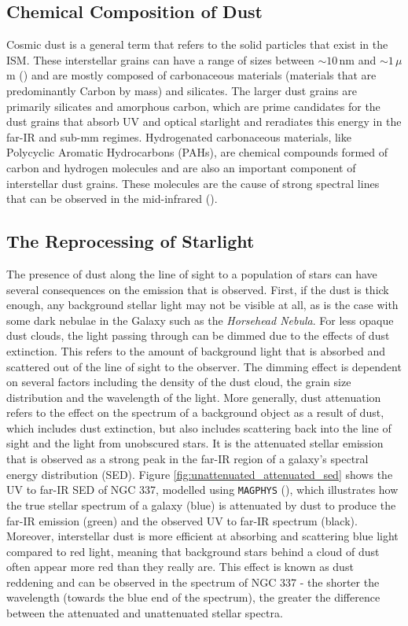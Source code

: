 \subsection{Chemical Composition of Dust}

Cosmic dust is a general term that refers to the solid particles that exist in the ISM. These interstellar grains can have a range of sizes between $\sim 10\,$nm and $\sim 1\,\mu$m (\citealt{Kim_1994, Galliano_2018}) and are mostly composed of carbonaceous materials (materials that are predominantly Carbon by mass) and silicates. The larger dust grains are primarily silicates and amorphous carbon, which are prime candidates for the dust grains that absorb UV and optical starlight and reradiates this energy in the far-IR and sub-mm regimes. Hydrogenated carbonaceous materials, like Polycyclic Aromatic Hydrocarbons (PAHs), are chemical compounds formed of carbon and hydrogen molecules and are also an important component of interstellar dust grains. These molecules are the cause of strong spectral lines that can be observed in the mid-infrared (\citealt{Tielens_1987, Draine_2007a, Draine_2007b}).

\subsection{The Reprocessing of Starlight}

The presence of dust along the line of sight to a population of stars can have several consequences on the emission that is observed. First, if the dust is thick enough, any background stellar light may not be visible at all, as is the case with some dark nebulae in the Galaxy such as the \textit{Horsehead Nebula}. For less opaque dust clouds, the light passing through can be dimmed due to the effects of dust extinction. This refers to the amount of background light that is absorbed and scattered out of the line of sight to the observer. The dimming effect is dependent on several factors including the density of the dust cloud, the grain size distribution and the wavelength of the light. More generally, dust attenuation refers to the effect on the spectrum of a background object as a result of dust, which includes dust extinction, but also includes scattering back into the line of sight and the light from unobscured stars. It is the attenuated stellar emission that is observed as a strong peak in the far-IR region of a galaxy's spectral energy distribution (SED). Figure \ref{fig:unattenuated_attenuated_sed} shows the UV to far-IR SED of NGC 337, modelled using \texttt{MAGPHYS} (\citealt{daCunha_2008}), which illustrates how the true stellar spectrum of a galaxy (blue) is attenuated by dust to produce the far-IR emission (green) and the observed UV to far-IR spectrum (black). Moreover, interstellar dust is more efficient at absorbing and scattering blue light compared to red light, meaning that background stars behind a cloud of dust often appear more red than they really are. This effect is known as dust reddening and can be observed in the spectrum of NGC 337 - the shorter the wavelength (towards the blue end of the spectrum), the greater the difference between the attenuated and unattenuated stellar spectra.

